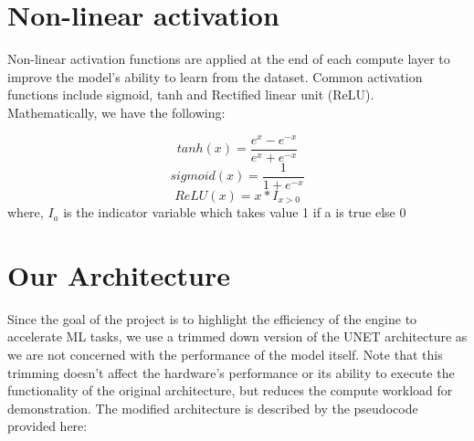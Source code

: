 \documentclass[a4paper,12pt, final]{report}
\begin{document}
\section{Non-linear activation}

Non-linear activation functions are applied at the end of each compute layer to improve the model's ability to learn from the dataset. Common activation functions include sigmoid, tanh and Rectified linear unit (ReLU).
\\

Mathematically, we have the following:

\begin{equation*}
	tanh(x) = \dfrac{e^x - e^{-x}}{e^x + e^{-x}}
\end{equation*}
\begin{equation*}
	sigmoid(x) = \dfrac{1}{1 + e^{-x}}
\end{equation*}
\begin{equation*}
	ReLU(x) = x*I_{x>0}
\end{equation*}
where, 
	$I_a$ is the indicator variable which takes value 1 if a is true else 0


\section{Our Architecture}

Since the goal of the project is to highlight the efficiency of the engine to accelerate ML tasks, we use a trimmed down version of the UNET architecture \cite{UNET} as we are not concerned with the performance of the model itself. Note that this trimming doesn't affect the hardware's performance or its ability to execute the functionality of the original architecture, but reduces the compute workload for demonstration. The modified architecture is described by the pseudocode provided here:

\end{document}
